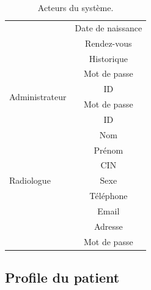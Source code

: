 \begin{table}[h!]
\begin{tabular}{lc}
                                              & Date de naissance              \\
                                              & Rendez-vous                    \\
                                              & Historique                     \\
                                              & Mot de passe                   \\
\multirow{2}{*}{Administrateur}               & ID                             \\
                                              & Mot de passe                   \\
\multirow{9}{*}{Radiologue}                   & ID                             \\
                                              & Nom                            \\
                                              & Prénom                         \\
                                              & CIN                            \\
                                              & Sexe                           \\
                                              & Téléphone                      \\
                                              & Email                          \\
                                              & Adresse                        \\
                                              & Mot de passe                  
\end{tabular}

\caption{Acteurs du système.}
\label{table:acteurs}

\end{table}




\subsection{Profile du patient}


